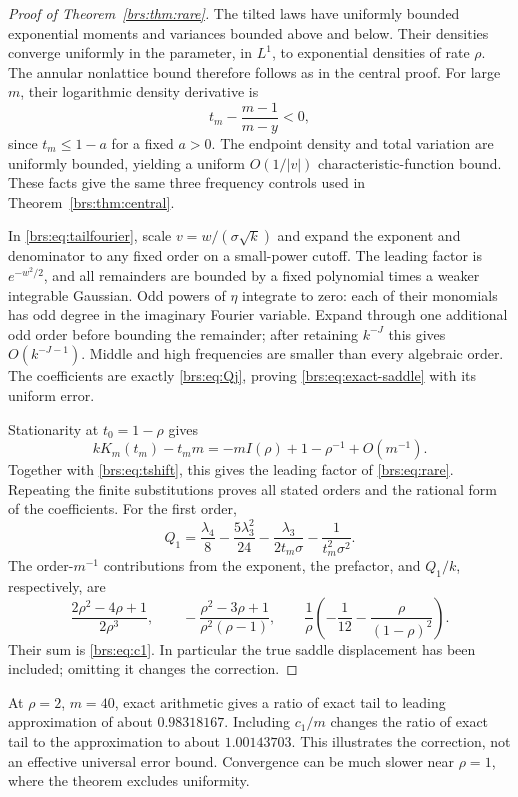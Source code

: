 \documentclass[11pt]{article}
\numberwithin{equation}{section}
\theoremstyle{remark}\newtheorem{remark}[theorem]{Remark}
\begin{document}
\begin{proof}[Proof of Theorem~\ref{brs:thm:rare}]
The tilted laws have uniformly bounded exponential moments and variances
bounded above and below.  Their densities converge uniformly in the
parameter, in $L^1$, to exponential densities of rate $\rho$.
The annular nonlattice bound therefore follows as in the central proof.
For large $m$, their logarithmic density derivative is
\[
 t_m-\frac{m-1}{m-y}<0,
\]
since $t_m\leq1-a$ for a fixed $a>0$.  The endpoint density and total
variation are uniformly bounded, yielding a uniform $O(1/|v|)$
characteristic-function bound.  These facts give the same three
frequency controls used in Theorem~\ref{brs:thm:central}.

In \eqref{brs:eq:tailfourier}, scale $v=w/(\sigma\sqrt k)$ and expand the
exponent and denominator to any fixed order on a small-power cutoff.
The leading factor is $e^{-w^2/2}$, and all remainders are bounded by a
fixed polynomial times a weaker integrable Gaussian.  Odd powers of
$\eta$ integrate to zero: each of their monomials has odd degree in the
imaginary Fourier variable.  Expand through one additional odd order
before bounding the remainder; after retaining $k^{-J}$ this gives
$O(k^{-J-1})$.  Middle and high frequencies are smaller than every
algebraic order.  The coefficients are exactly \eqref{brs:eq:Qj}, proving
\eqref{brs:eq:exact-saddle} with its uniform error.

Stationarity at $t_0=1-\rho$ gives
\[
 kK_m(t_m)-t_mm=-mI(\rho)+1-\rho^{-1}+O(m^{-1}).
\]
Together with \eqref{brs:eq:tshift}, this gives the leading factor of
\eqref{brs:eq:rare}.  Repeating the finite substitutions proves all stated
orders and the rational form of the coefficients.  For the first order,
\begin{equation}\label{brs:eq:Q1}
 Q_1=\frac{\lambda_4}{8}-\frac{5\lambda_3^2}{24}
       -\frac{\lambda_3}{2t_m\sigma}
       -\frac1{t_m^2\sigma^2}.
\end{equation}
The order-$m^{-1}$ contributions from the exponent, the prefactor, and
$Q_1/k$, respectively, are
\[
 \frac{2\rho^2-4\rho+1}{2\rho^3},\qquad
 -\frac{\rho^2-3\rho+1}{\rho^2(\rho-1)},\qquad
 \frac1\rho\left(-\frac1{12}-\frac{\rho}{(1-\rho)^2}\right).
\]
Their sum is \eqref{brs:eq:c1}.  In particular the true saddle displacement
has been included; omitting it changes the correction.
\end{proof}

At $\rho=2$, $m=40$, exact arithmetic gives a ratio of exact tail to
leading approximation of about $0.98318167$.  Including $c_1/m$ changes
the ratio of exact tail to the approximation to about $1.00143703$.
This illustrates the correction, not an effective universal error bound.
Convergence can be much slower near $\rho=1$, where the theorem excludes
uniformity.
\end{document}
